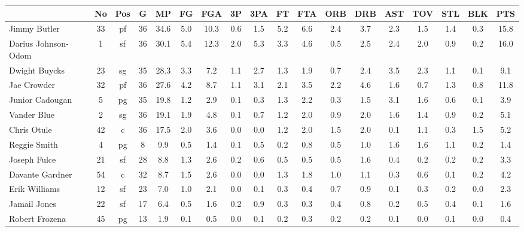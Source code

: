 \documentclass[10pt,letterpaper]{article}
\begin{document}
\begin{table}[ht]
\begin{center}
\begin{tabular}{lccccccccccccccccc}
  \hline
 & No & Pos & G & MP & FG & FGA & 3P & 3PA & FT & FTA & ORB & DRB & AST & TOV & STL & BLK & PTS \\ 
  \hline
Jimmy Butler & 33 & pf & 36 & 34.6 & 5.0 & 10.3 & 0.6 & 1.5 & 5.2 & 6.6 & 2.4 & 3.7 & 2.3 & 1.5 & 1.4 & 0.3 & 15.8 \\ 
  Darius Johnson-Odom & 1 & sf & 36 & 30.1 & 5.4 & 12.3 & 2.0 & 5.3 & 3.3 & 4.6 & 0.5 & 2.5 & 2.4 & 2.0 & 0.9 & 0.2 & 16.0 \\ 
  Dwight Buycks & 23 & sg & 35 & 28.3 & 3.3 & 7.2 & 1.1 & 2.7 & 1.3 & 1.9 & 0.7 & 2.4 & 3.5 & 2.3 & 1.1 & 0.1 & 9.1 \\ 
  Jae Crowder & 32 & pf & 36 & 27.6 & 4.2 & 8.7 & 1.1 & 3.1 & 2.1 & 3.5 & 2.2 & 4.6 & 1.6 & 0.7 & 1.3 & 0.8 & 11.8 \\ 
  Junior Cadougan & 5 & pg & 35 & 19.8 & 1.2 & 2.9 & 0.1 & 0.3 & 1.3 & 2.2 & 0.3 & 1.5 & 3.1 & 1.6 & 0.6 & 0.1 & 3.9 \\ 
  Vander Blue & 2 & sg & 36 & 19.1 & 1.9 & 4.8 & 0.1 & 0.7 & 1.2 & 2.0 & 0.9 & 2.0 & 1.6 & 1.4 & 0.9 & 0.2 & 5.1 \\ 
  Chris Otule & 42 & c & 36 & 17.5 & 2.0 & 3.6 & 0.0 & 0.0 & 1.2 & 2.0 & 1.5 & 2.0 & 0.1 & 1.1 & 0.3 & 1.5 & 5.2 \\ 
  Reggie Smith & 4 & pg & 8 & 9.9 & 0.5 & 1.4 & 0.1 & 0.5 & 0.2 & 0.8 & 0.5 & 1.0 & 1.6 & 1.6 & 1.1 & 0.2 & 1.4 \\ 
  Joseph Fulce & 21 & sf & 28 & 8.8 & 1.3 & 2.6 & 0.2 & 0.6 & 0.5 & 0.5 & 0.5 & 1.6 & 0.4 & 0.2 & 0.2 & 0.2 & 3.3 \\ 
  Davante Gardner & 54 & c & 32 & 8.7 & 1.5 & 2.6 & 0.0 & 0.0 & 1.3 & 1.8 & 1.0 & 1.1 & 0.3 & 0.6 & 0.1 & 0.2 & 4.2 \\ 
  Erik Williams & 12 & sf & 23 & 7.0 & 1.0 & 2.1 & 0.0 & 0.1 & 0.3 & 0.4 & 0.7 & 0.9 & 0.1 & 0.3 & 0.2 & 0.0 & 2.3 \\ 
  Jamail Jones & 22 & sf & 17 & 6.4 & 0.5 & 1.6 & 0.2 & 0.9 & 0.3 & 0.3 & 0.4 & 0.8 & 0.2 & 0.5 & 0.4 & 0.1 & 1.6 \\ 
  Robert Frozena & 45 & pg & 13 & 1.9 & 0.1 & 0.5 & 0.0 & 0.1 & 0.2 & 0.3 & 0.2 & 0.2 & 0.1 & 0.0 & 0.1 & 0.0 & 0.4 \\ 
   \hline
\end{tabular}
\end{center}
\end{table}
\end{document}

